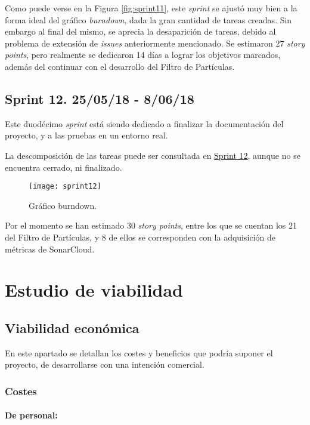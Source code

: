 Como puede verse en la Figura \ref{fig:sprint11}, este \emph{sprint} se ajustó muy bien a la forma ideal del gráfico \emph{burndown}, dada la gran cantidad de tareas creadas. Sin embargo al final del mismo, se aprecia la desaparición de tareas, debido al problema de extensión de \emph{issues} anteriormente mencionado.
Se estimaron 27 \emph{story points}, pero realmente se dedicaron 14 días a lograr los objetivos marcados, además del continuar con el desarrollo del Filtro de Partículas.

\subsection{Sprint 12. 25/05/18 - 8/06/18}

Este duodécimo \emph{sprint} está siendo dedicado a finalizar la documentación del proyecto, y a las pruebas en un entorno real. 

La descomposición de las tareas puede ser consultada en \href{https://github.com/mbm0089/gii_0_17.02_snsi/milestone/11}{Sprint 12}, aunque no se encuentra cerrado, ni finalizado.

\begin{figure}
	\centering
	\texttt{[image: sprint12]}
	\caption[Burndown Sprint 12]{Gráfico burndown.}\label{fig:sprint12}
\end{figure}

Por el momento se han estimado 30 \emph{story points}, entre los que se cuentan los 21 del Filtro de Partículas, y 8 de ellos se corresponden con la adquisición de métricas de SonarCloud.  



\section{Estudio de viabilidad}

\subsection{Viabilidad económica}

En este apartado se detallan los costes y beneficios que podría suponer el proyecto, de desarrollarse con una intención comercial. 

\subsubsection{Costes}

\paragraph{De personal:}

